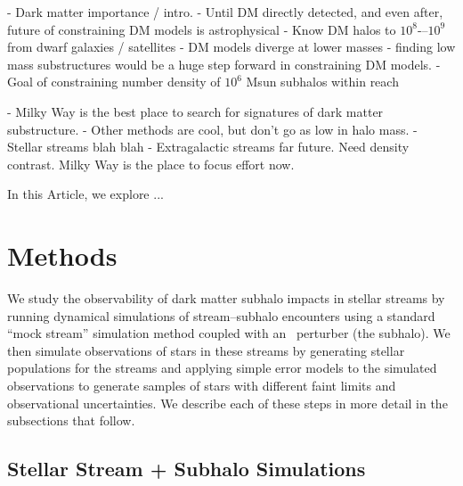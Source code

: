 - Dark matter importance / intro.
- Until DM directly detected, and even after, future of constraining DM models is astrophysical
- Know DM halos to $10^8$-–$10^9$ from dwarf galaxies / satellites
- DM models diverge at lower masses - finding low mass substructures would be a huge step forward in constraining DM models.
- Goal of constraining number density of $10^6$ Msun subhalos within reach

- Milky Way is the best place to search for signatures of dark matter substructure.
- Other methods are cool, but don't go as low in halo mass.
- Stellar streams blah blah
- Extragalactic streams far future. Need density contrast. Milky Way is the place to focus effort now.

In this Article, we explore ...

\section{Methods} \label{sec:methods}

We study the observability of dark matter subhalo impacts in stellar streams by running
dynamical simulations of stream--subhalo encounters using a standard ``mock stream''
simulation method coupled with an \nbody\ perturber (the subhalo).
We then simulate observations of stars in these streams by generating stellar
populations for the streams and applying simple error models to the simulated
observations to generate samples of stars with different faint limits and observational
uncertainties.
We describe each of these steps in more detail in the subsections that follow.

\subsection{Stellar Stream + Subhalo Simulations} \label{sec:streams}

